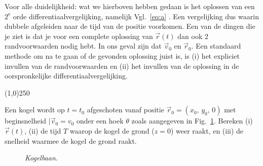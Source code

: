 Voor alle duidelijkheid: wat we hierboven hebben gedaan is het oplossen van een $2^{\mathrm{e}}$ orde 
differentiaalvergelijking, namelijk  Vgl.~\ref{eq:a} . Een vergelijking dus waarin dubbele afgeleiden naar de tijd 
van de positie voorkomen. Een van de dingen die je ziet is dat je voor een complete oplossing van $\vec{r}(t)$ dan ook 2 
randvoorwaarden nodig hebt. In ons geval zijn dat $\vec{v}_0$ en $\vec{r}_0$. Een standaard methode om na te gaan of de
gevonden oplossing juist is, is (i) het expliciet invullen van de randvoorwaarden en (ii) het invullen van de oplossing in de
oorspronkelijke differentiaalvergelijking. 

\begin{center}
\line(1,0){250}
\end{center}

\begin{voorbeeld} 
\label{ex:parabool}
Een kogel wordt op $t=t_0$ afgeschoten vanaf positie $\vec{r}_0 = (x_0,\,y_0,\,0)$ met beginsnelheid 
$|\vec{v}_0=v_0$ onder een hoek $\theta$ zoals aangegeven in Fig.~\ref{fig:ex1}. Bereken (i) $\vec{r}(t)$, (ii) de 
tijd $T$ waarop de kogel de grond ($z=0$) weer raakt, en (iii) de snelheid waarmee de kogel de grond raakt. 
\begin{figure}[htbp]
\begin{center}
\caption{{\it Kogelbaan. }}
\label{fig:ex1}
\end{center}
\end{figure} 


\end{voorbeeld}
